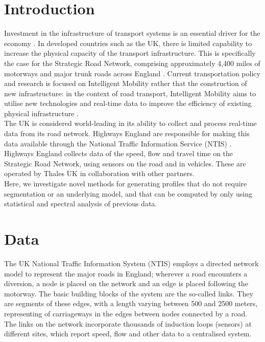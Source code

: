 \documentclass[conference]{IEEEtran}
\begin{document}
\section{Introduction}
Investment in the infrastructure of transport systems is an essential driver for the economy \cite{government}. In developed countries such as the UK, there is limited capability to increase the physical capacity of the transport infrastructure. This is specifically the case for the Strategic Road Network, comprising approximately 4,400 miles of motorways and major trunk roads across England \cite{Strategic}. Current transportation policy and research is focused on Intelligent Mobility rather that the construction of new infrastructure: in the context of road transport, Intelligent Mobility aims to utilise new technologies and real-time data to improve the efficiency of existing physical infrastructure \cite{needs}.\\

The UK is considered world-leading in its ability to collect and process real-time data from its road network. Highways England are responsible for making this data available through the National Traffic Information Service (NTIS) \cite{NTIS}. Highways England collects data of the speed, flow and travel time on the Strategic Road Network, using sensors on the road and in vehicles. These are operated by Thales UK in collaboration with other partners.\\

Here, we investigate novel methods for generating profiles that do not require segmentation or an underlying model, and that can be computed by only using statistical and spectral analysis of previous data.

\section{Data}
The UK National Traffic Information System (NTIS) employs a directed network model to represent the major roads in England; wherever a road encounters a diversion, a node is placed on the network and an edge is placed following the motorway. The basic building blocks of the system are the so-called links. They are segments of these edges, with a length varying between 500 and 2500 meters, representing of carriageways in the edges between nodes connected by a road. The links on the network incorporate thousands of induction loops (sensors) at different sites, which report speed, flow and other data to a centralised system.\\
\end{document}
